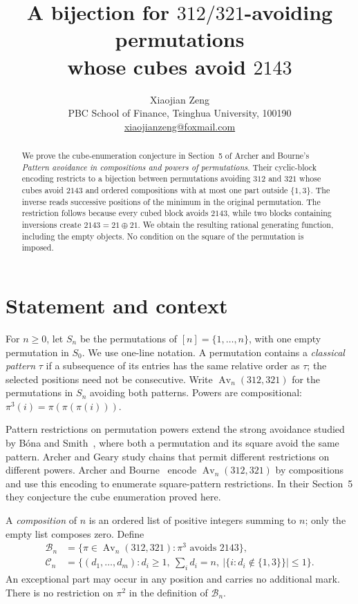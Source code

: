 \documentclass[11pt]{article}
\title{A bijection for $312/321$-avoiding permutations\\
whose cubes avoid $2143$}
\author{Xiaojian Zeng\\[3pt]
\small PBC School of Finance, Tsinghua University, 100190\\
\small\href{mailto:xiaojianzeng@foxmail.com}{xiaojianzeng@foxmail.com}}
\date{}
\newcommand{\Av}{\operatorname{Av}}
\newcommand{\C}{\mathcal C}
\newcommand{\B}{\mathcal B}
\begin{document}
\maketitle

\begin{abstract}
We prove the cube-enumeration conjecture in Section~5 of Archer and
Bourne's \emph{Pattern avoidance in compositions and powers of
permutations}. Their cyclic-block encoding restricts to a bijection
between permutations avoiding $312$ and $321$ whose cubes avoid $2143$
and ordered compositions with at most one part outside $\{1,3\}$.
The inverse reads successive positions of the minimum in the original
permutation. The restriction follows because every cubed block avoids
$2143$, while two blocks containing inversions create $2143=21\oplus21$.
We obtain the resulting rational generating function, including the empty
objects. No condition on the square of the permutation is imposed.
\end{abstract}

\section{Statement and context}

For $n\geq0$, let $S_n$ be the permutations of $[n]=\{1,\ldots,n\}$,
with one empty permutation in $S_0$. We use one-line notation. A
permutation contains a \emph{classical pattern} $\tau$ if a subsequence
of its entries has the same relative order as $\tau$; the selected
positions need not be consecutive. Write $\Av_n(312,321)$ for the
permutations in $S_n$ avoiding both patterns. Powers are compositional:
$\pi^3(i)=\pi(\pi(\pi(i)))$.

Pattern restrictions on permutation powers extend the strong avoidance
studied by B\'ona and Smith~\cite{BonaSmith2019}, where both a permutation
and its square avoid the same pattern. Archer and Geary
\cite{ArcherGeary2024} study chains that permit different restrictions
on different powers. Archer and Bourne~\cite{ArcherBourne2026} encode
$\Av_n(312,321)$ by compositions and use this encoding to enumerate
square-pattern restrictions. In their Section~5 they conjecture the
cube enumeration proved here.

A \emph{composition} of $n$ is an ordered list of positive integers
summing to $n$; only the empty list composes zero. Define
\begin{align*}
\B_n&=\{\pi\in\Av_n(312,321):\pi^3\text{ avoids }2143\},\\
\C_n&=\{(d_1,\ldots,d_m):d_i\geq1,\ \textstyle\sum_i d_i=n,
          \ |\{i:d_i\notin\{1,3\}\}|\leq1\}.
\end{align*}
An exceptional part may occur in any position and carries no additional
mark. There is no restriction on $\pi^2$ in the definition of $\B_n$.
\end{document}
